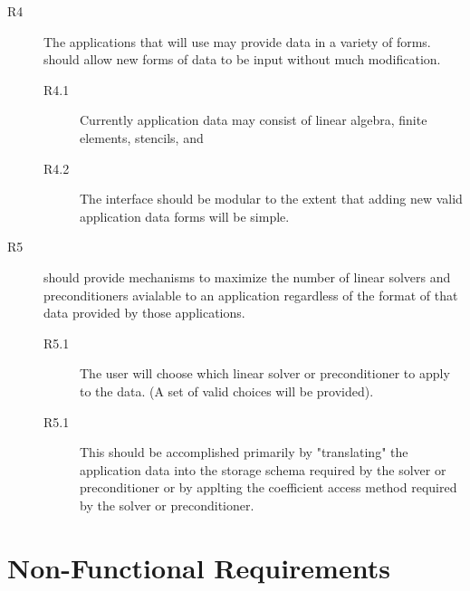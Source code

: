 \begin{description}
\begin{description}
\end{description}

\item[R4] The applications that will use \hypre{} may provide data in a
variety of forms.  \hypre{} should allow new forms of data to be input
without much modification.
\begin{description}

\item[R4.1] Currently application data may consist of linear algebra,
finite elements, stencils, and

\item[R4.2] The \hypre{} interface should be modular to the extent that
adding new valid application data forms will be simple.

\end{description}

\item[R5] \hypre{} should provide mechanisms to maximize the number of
linear solvers and preconditioners avialable to an application
regardless of the format of that data provided by those applications.
\begin{description}

\item[R5.1] The user will choose which linear solver or preconditioner
to apply to the data. (A set of valid choices will be provided).

\item[R5.1] This should be accomplished primarily by "translating"
the application data into the storage schema required by the solver or
preconditioner or by applting the coefficient access method required
by the solver or preconditioner.

\end{description}

\end{description}

\section{Non-Functional Requirements}
\label{Non-Functional Requirements}

